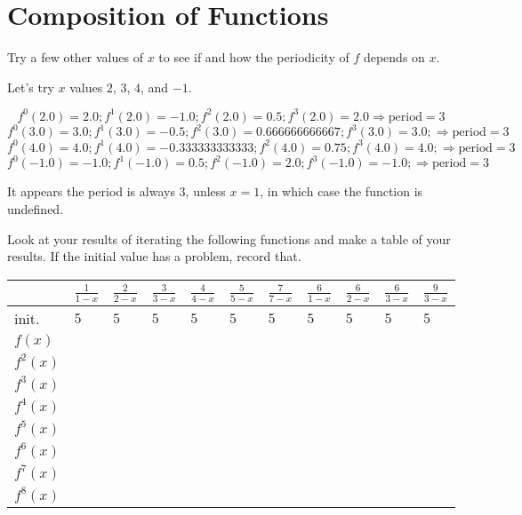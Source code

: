 \documentclass[../gatm_answers.tex]{subfiles}
\begin{document}
\section{Composition of Functions}

\begin{outer_problem}
\item Try a few other values of $x$ to see if and how the periodicity of $f$ depends on $x$.
\end{outer_problem}

Let's try $x$ values $2$, $3$, $4$, and $-1$.

$$f^0 (2.0) = 2.0; f^1 (2.0) = -1.0; f^2 (2.0) = 0.5; f^3 (2.0) = 2.0 \Longrightarrow \text{period} = 3$$
$$f^0 (3.0) = 3.0; f^1 (3.0) = -0.5; f^2 (3.0) = 0.666666666667; f^3 (3.0) = 3.0; \Longrightarrow \text{period} = 3$$
$$f^0 (4.0) = 4.0; f^1 (4.0) = -0.333333333333; f^2 (4.0) = 0.75; f^3 (4.0) = 4.0; \Longrightarrow \text{period} = 3$$
$$f^0 (-1.0) = -1.0; f^1 (-1.0) = 0.5; f^2 (-1.0) = 2.0; f^3 (-1.0) = -1.0; \Longrightarrow \text{period} = 3$$

It appears the period is always $3$, unless $x=1$, in which case the function is undefined.

\begin{outer_problem}
\item Look at your results of iterating the following functions and make a table of your results. If the initial value has a problem, record that.
\end{outer_problem}


\begin{tabular}{|l|l|l|l|l|l|l|l|l|l|l|}
\hline
         & $\frac{1}{1-x}$ & $\frac{2}{2-x}$ & $\frac{3}{3-x}$ & $\frac{4}{4-x}$ & $\frac{5}{5-x}$ & $\frac{7}{7-x}$ & $\frac{6}{1-x}$ & $\frac{6}{2-x}$ & $\frac{6}{3-x}$ & $\frac{9}{3-x}$ \\ \hline
init.    & $5$   & $5$   & $5$ & $5$ & $5$ & $5$ & $5$ & $5$ & $5$ & $5$ \\ \hline
$f(x)$   &       &       &   &   &   &   &   &   &   &   \\ \hline
$f^2(x)$ &       &       &   &   &   &   &   &   &   &   \\ \hline
$f^3(x)$ &       &       &   &   &   &   &   &   &   &   \\ \hline
$f^4(x)$ &       &       &   &   &   &   &   &   &   &   \\ \hline
$f^5(x)$ &       &       &   &   &   &   &   &   &   &   \\ \hline
$f^6(x)$ &       &       &   &   &   &   &   &   &   &   \\ \hline
$f^7(x)$ &       &       &   &   &   &   &   &   &   &   \\ \hline
$f^8(x)$ &       &       &   &   &   &   &   &   &   &   \\ \hline
\end{tabular}
\end{document}
